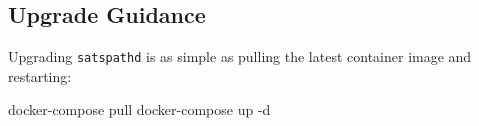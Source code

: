 \documentclass[
]{article}
\newenvironment{Shaded}{}{}
\newcommand{\AttributeTok}[1]{\textcolor[rgb]{0.49,0.56,0.16}{#1}}
\newcommand{\ExtensionTok}[1]{#1}
\newcommand{\NormalTok}[1]{#1}
\begin{document}
\hypertarget{upgrade-guidance}{%
\subsection{Upgrade Guidance}\label{upgrade-guidance}}

Upgrading \texttt{satspathd} is as simple as pulling the latest
container image and restarting:

\begin{Shaded}
\begin{Highlighting}[]
\ExtensionTok{docker{-}compose}\NormalTok{ pull}
\ExtensionTok{docker{-}compose}\NormalTok{ up }\AttributeTok{{-}d}
\end{Highlighting}
\end{Shaded}
\end{document}

